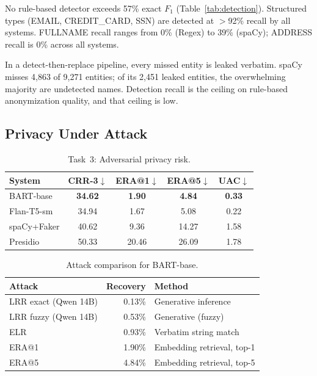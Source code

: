 \documentclass[10pt,twocolumn]{article}
\begin{document}
No rule-based detector exceeds 57\% exact $F_1$ (Table~\ref{tab:detection}).
Structured types (EMAIL, CREDIT\_CARD, SSN) are detected at $>$92\% recall by all systems.
FULLNAME recall ranges from 0\% (Regex) to 39\% (spaCy); ADDRESS recall is 0\% across all systems.

In a detect-then-replace pipeline, every missed entity is leaked verbatim.
spaCy misses 4{,}863 of 9{,}271 entities; of its 2{,}451 leaked entities, the overwhelming majority are undetected names.
Detection recall is the ceiling on rule-based anonymization quality, and that ceiling is low.

\subsection{Privacy Under Attack}\label{sec:res-attack}

\begin{table}[t]
\centering
\caption{Task~3: Adversarial privacy risk.}\label{tab:privacy}
\small
\begin{tabular}{@{}lcccc@{}}
\toprule
System & CRR-3$\downarrow$ & ERA@1$\downarrow$ & ERA@5$\downarrow$ & UAC$\downarrow$ \\
\midrule
BART-base & \textbf{34.62} & \textbf{1.90} & \textbf{4.84} & \textbf{0.33} \\
Flan-T5-sm & 34.94 & 1.67 & 5.08 & 0.22 \\
spaCy+Faker & 40.62 & 9.36 & 14.27 & 1.58 \\
Presidio & 50.33 & 20.46 & 26.09 & 1.78 \\
\bottomrule
\end{tabular}
\end{table}

\begin{table}[t]
\centering
\caption{Attack comparison for BART-base.}\label{tab:attack_compare}
\small
\begin{tabular}{@{}lrl@{}}
\toprule
Attack & Recovery & Method \\
\midrule
LRR exact (Qwen 14B) & 0.13\% & Generative inference \\
LRR fuzzy (Qwen 14B) & 0.53\% & Generative (fuzzy) \\
ELR & 0.93\% & Verbatim string match \\
ERA@1 & 1.90\% & Embedding retrieval, top-1 \\
ERA@5 & 4.84\% & Embedding retrieval, top-5 \\
\bottomrule
\end{tabular}
\end{table}
\end{document}
